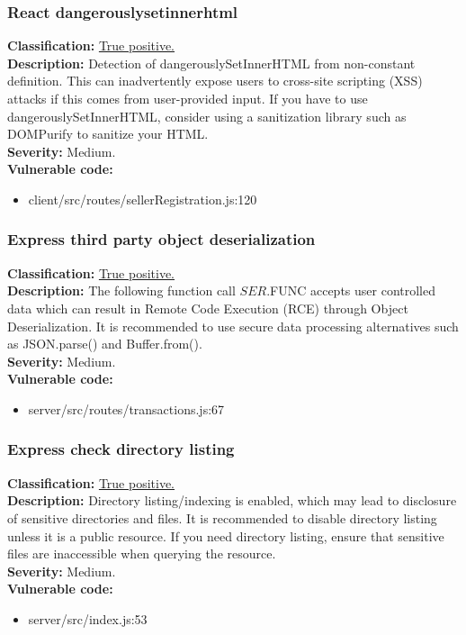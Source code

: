 \documentclass[]{article}
\begin{document}
\subsubsection{React dangerouslysetinnerhtml}
\textbf{Classification:} \hyperref[par:stored_xss]{True positive.} \\ 
\textbf{Description:} Detection of dangerouslySetInnerHTML from non-constant definition. This can 
inadvertently expose users to cross-site scripting (XSS) attacks if this comes from user-provided
input. If you have to use dangerouslySetInnerHTML, consider using a sanitization library such as 
DOMPurify to sanitize your HTML. \\ 
\textbf{Severity:} Medium. \\ 
\textbf{Vulnerable code:} 
\begin{itemize}
    \item client/src/routes/sellerRegistration.js:120
\end{itemize}

\subsubsection{Express third party object deserialization}
\textbf{Classification:} \hyperref[subsubsec:deserialization_of_untrusted_data]{True positive.} \\ 
\textbf{Description:} The following function call $SER.$FUNC accepts user controlled data which 
can result in Remote Code Execution (RCE) through Object Deserialization. It is recommended to 
use secure data processing alternatives such as JSON.parse() and Buffer.from(). \\ 
\textbf{Severity:} Medium. \\ 
\textbf{Vulnerable code:} 
\begin{itemize}
    \item server/src/routes/transactions.js:67
\end{itemize}

\subsubsection{Express check directory listing}
\textbf{Classification:} \hyperref[subsubsec:exposure_of_information_through_directory_listing]{True positive.} \\ 
\textbf{Description:} Directory listing/indexing is enabled, which may lead to disclosure of sensitive directories 
and files. It is recommended to disable directory listing unless it is a public resource. If you need directory listing, 
ensure that sensitive files are inaccessible when querying the resource. \\ 
\textbf{Severity:} Medium. \\ 
\textbf{Vulnerable code:} 
\begin{itemize}
    \item server/src/index.js:53
\end{itemize}
\end{document}
